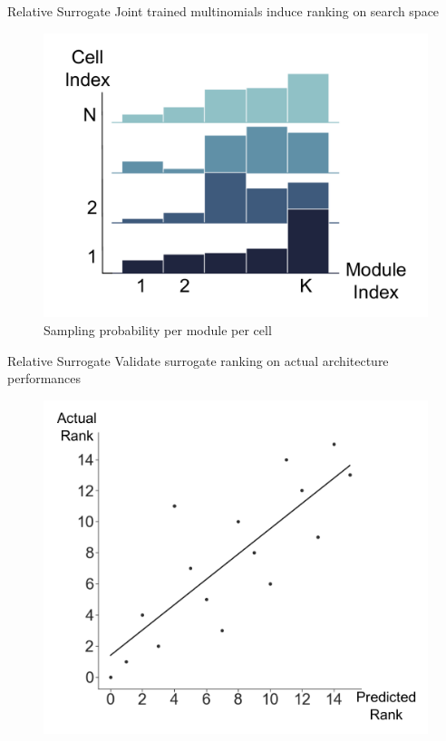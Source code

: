 \documentclass[]{beamer}
\begin{document}
\begin{frame}{Relative Surrogate}
\vspace{10pt}
Joint trained multinomials induce ranking on search space
\vfill
\begin{figure}
    \includegraphics[scale=0.38, center]{graphics/v2_marginals.pdf}
    \caption{Sampling probability per module per cell}
\end{figure}
\end{frame}

\begin{frame}{Relative Surrogate}
\vspace{10pt}
Validate surrogate ranking on actual architecture performances
\vfill
\begin{figure}
    \includegraphics[scale=0.45, center]{graphics/spearman_validation.pdf}
\end{figure}
\end{frame}
\end{document}
